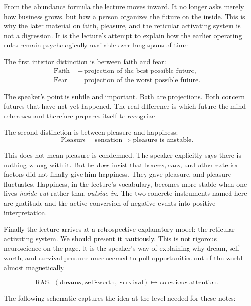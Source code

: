 From the abundance formula the lecture moves inward. It no longer asks merely how business grows, but how a person organizes the future on the inside. This is why the later material on faith, pleasure, and the reticular activating system is not a digression. It is the lecture's attempt to explain how the earlier operating rules remain psychologically available over long spans of time.

The first interior distinction is between faith and fear:
\begin{align}
\text{Faith} &= \text{projection of the best possible future},\\
\text{Fear} &= \text{projection of the worst possible future}.
\end{align}

The speaker's point is subtle and important. Both are projections. Both concern futures that have not yet happened. The real difference is which future the mind rehearses and therefore prepares itself to recognize.

The second distinction is between pleasure and happiness:
\begin{equation}
\text{Pleasure} = \text{sensation}
\Longrightarrow
\text{pleasure is unstable}.
\end{equation}

This does not mean pleasure is condemned. The speaker explicitly says there is nothing wrong with it. But he does insist that houses, cars, and other exterior factors did not finally give him happiness. They gave pleasure, and pleasure fluctuates. Happiness, in the lecture's vocabulary, becomes more stable when one lives \emph{inside out} rather than \emph{outside in}. The two concrete instruments named here are gratitude and the active conversion of negative events into positive interpretation.

Finally the lecture arrives at a retrospective explanatory model: the reticular activating system. We should present it cautiously. This is not rigorous neuroscience on the page. It is the speaker's way of explaining why dream, self-worth, and survival pressure once seemed to pull opportunities out of the world almost magnetically.

\begin{equation}
\mathrm{RAS}:\ (\text{dreams},\ \text{self-worth},\ \text{survival})
\longmapsto
\text{conscious attention}.
\end{equation}

The following schematic captures the idea at the level needed for these notes:

